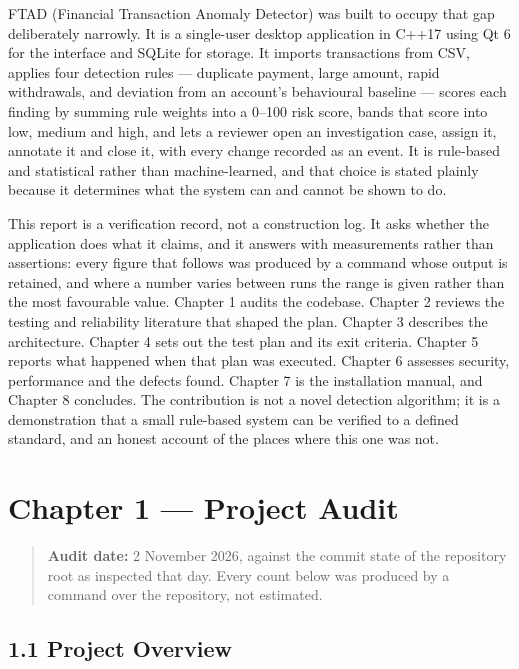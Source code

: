 \documentclass[
  12pt,
]{report}
\begin{document}
FTAD (Financial Transaction Anomaly Detector) was built to occupy that
gap deliberately narrowly. It is a single-user desktop application in
C++17 using Qt 6 for the interface and SQLite for storage. It imports
transactions from CSV, applies four detection rules --- duplicate
payment, large amount, rapid withdrawals, and deviation from an
account's behavioural baseline --- scores each finding by summing rule
weights into a 0--100 risk score, bands that score into low, medium and
high, and lets a reviewer open an investigation case, assign it,
annotate it and close it, with every change recorded as an event. It is
rule-based and statistical rather than machine-learned, and that choice
is stated plainly because it determines what the system can and cannot
be shown to do.

This report is a verification record, not a construction log. It asks
whether the application does what it claims, and it answers with
measurements rather than assertions: every figure that follows was
produced by a command whose output is retained, and where a number
varies between runs the range is given rather than the most favourable
value. Chapter 1 audits the codebase. Chapter 2 reviews the testing and
reliability literature that shaped the plan. Chapter 3 describes the
architecture. Chapter 4 sets out the test plan and its exit criteria.
Chapter 5 reports what happened when that plan was executed. Chapter 6
assesses security, performance and the defects found. Chapter 7 is the
installation manual, and Chapter 8 concludes. The contribution is not a
novel detection algorithm; it is a demonstration that a small rule-based
system can be verified to a defined standard, and an honest account of
the places where this one was not.

\chapter{Chapter 1 --- Project Audit}\label{chapter-1-project-audit}

\begin{quote}
\textbf{Audit date:} 2 November 2026, against the commit state of the
repository root as inspected that day. Every count below was produced by
a command over the repository, not estimated.
\end{quote}

\section{1.1 Project Overview}\label{project-overview}
\end{document}
